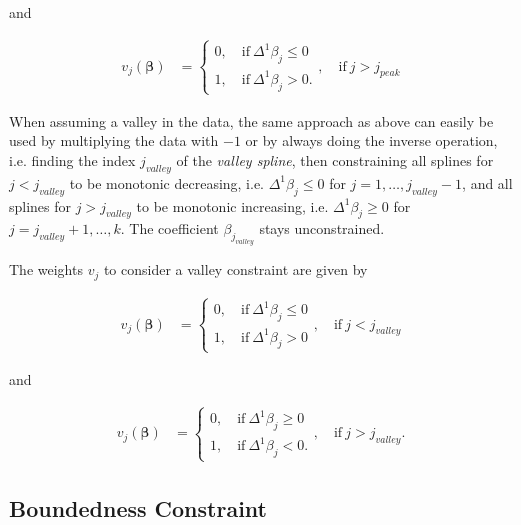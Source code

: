 \documentclass[10pt,a4paper]{article}
\begin{document}
	and 
	
	\begin{align}\label{eq:v_peak_2}
		v_j(\boldsymbol{\beta}) &= \begin{cases} 
								 		0, \quad \text{if} \ \Delta^1\beta_j \le 0 \\ 
								 		1, \quad \text{if} \ \Delta^1\beta_j > 0.
								  \end{cases}, \quad \text{if} \ j > j_{peak}
	\end{align}
	
	When assuming a valley in the data, the same approach as above can easily be used by multiplying the data with $-1$ or by always doing the inverse operation, i.e. finding the index $j_{valley}$ of the \emph{valley spline}, then constraining all splines for $j < j_{valley}$ to be monotonic decreasing, i.e. $\Delta^1 \beta_j \le 0$ for $j = 1, \dots, j_{valley}-1$, and all splines for $j > j_{valley}$ to be monotonic increasing, i.e. $\Delta^1 \beta_j \ge 0$ for $j = j_{valley}+1, \dots, k$. The coefficient $\beta_{j_{valley}}$ stays unconstrained. 
	
	The weights $v_j$ to consider a valley constraint are given by
	
	\begin{align}\label{eq:v_valley_1}
		v_j(\boldsymbol{\beta}) &= \begin{cases} 
										0, \quad \text{if} \ \Delta^1\beta_j \le 0 \\ 
										1, \quad \text{if} \ \Delta^1\beta_j > 0
								   \end{cases}, \quad \text{if} \ j < j_{valley}
	\end{align}
	
	and 
	
	\begin{align}\label{eq:v_valley_2}
		v_j(\boldsymbol{\beta}) &= \begin{cases} 
										0, \quad \text{if} \ \Delta^1\beta_j \ge 0 \\ 
										1, \quad \text{if} \ \Delta^1\beta_j < 0.
									\end{cases}, \quad \text{if} \ j > j_{valley}.
	\end{align}
	
	\subsection{Boundedness Constraint}
	
\end{document}
